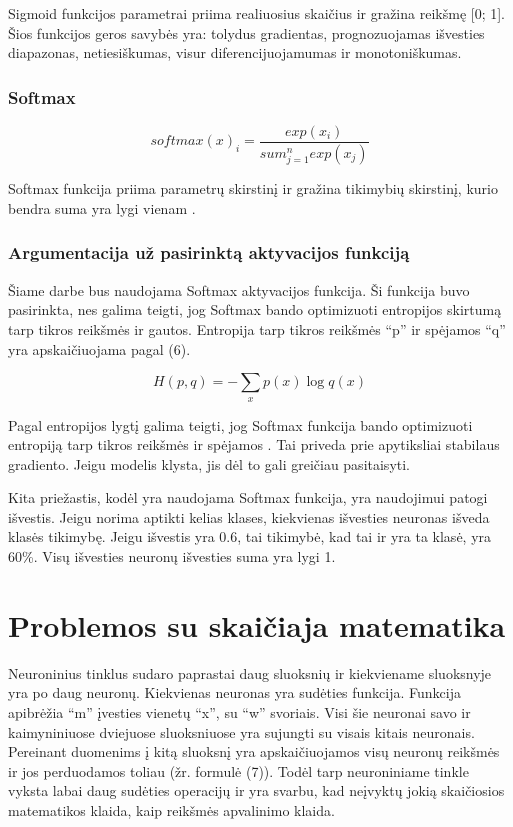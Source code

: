 \documentclass{VUMIFInfKursinis}
\begin{document}
\par
Sigmoid funkcijos parametrai priima realiuosius skaičius ir gražina reikšmę [0; 1].
Šios funkcijos geros savybės yra: tolydus gradientas, prognozuojamas išvesties
diapazonas, netiesiškumas, visur diferencijuojamumas ir monotoniškumas. \cite{salt16}

\subsubsection{Softmax}
\begin{equation}
  softmax(x)_i = \frac{exp(x_i)}{sum_{j=1}^{n}exp(x_j)}
\end{equation}

\par
Softmax funkcija priima parametrų skirstinį ir gražina tikimybių skirstinį,
kurio bendra suma yra lygi vienam \cite{salt16}.

\subsubsection{Argumentacija už pasirinktą aktyvacijos funkciją}
\par
Šiame darbe bus naudojama Softmax aktyvacijos funkcija. Ši funkcija buvo
pasirinkta, nes galima teigti, jog Softmax bando optimizuoti entropijos
skirtumą tarp tikros reikšmės ir gautos. Entropija tarp tikros reikšmės
\enquote{p} ir spėjamos \enquote{q} yra apskaičiuojama pagal (6).

\begin{equation}
H(p, q) = - \sum_{x}p(x) \log q(x)
\end{equation}

\par
Pagal entropijos lygtį galima teigti, jog Softmax funkcija
bando optimizuoti entropiją tarp tikros reikšmės ir spėjamos \cite{salt6}.
Tai priveda prie apytiksliai stabilaus gradiento. Jeigu modelis klysta,
jis dėl to gali greičiau pasitaisyti.
\par
Kita priežastis, kodėl yra naudojama Softmax funkcija, yra naudojimui
patogi išvestis. Jeigu norima aptikti kelias klases, kiekvienas išvesties
neuronas išveda klasės tikimybę. Jeigu išvestis yra 0.6, tai tikimybė, kad tai ir
yra ta klasė, yra 60\%. Visų išvesties neuronų išvesties suma yra lygi 1.

\section{Problemos su skaičiaja matematika}
\par
Neuroninius tinklus sudaro paprastai daug sluoksnių ir kiekviename sluoksnyje yra po
daug neuronų. Kiekvienas neuronas yra sudėties funkcija. Funkcija apibrėžia \enquote{m} įvesties
vienetų \enquote{x}, su \enquote{w} svoriais. Visi šie neuronai savo ir kaimyniniuose dviejuose sluoksniuose
yra sujungti su visais kitais neuronais. Pereinant duomenims į kitą sluoksnį yra apskaičiuojamos
visų neuronų reikšmės ir jos perduodamos toliau (žr. formulė (7)). Todėl tarp neuroniniame tinkle vyksta
labai daug sudėties operacijų ir yra svarbu, kad neįvyktų jokią skaičiosios matematikos klaida,
kaip reikšmės apvalinimo klaida.
\end{document}
